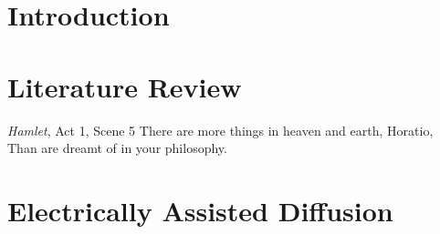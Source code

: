 \documentclass[a4paper, 12pt, twoside]{report}
\begin{document}
% 

 \pagestyle{empty}
 \setcounter{page}{1}
 
 
 \def\localpath{ThesisFrontmatter}
 
 
 \sglspace
 
 
 \tableofcontents
 \newpage
 
 \listoffigures
 \newpage
 
 \listoftables
 \newpage

 
 \newpage
 
 
 \newpage

 \setcounter{page}{0}
 \pagestyle{thesisheadings}
 
 
 \def\localpath{Intro}
 \chapter{Introduction}
 \dblspace
 \begin{quote}{\em }\end{quote}
 
 
 \def\localpath{LitReview}
 \chapter{Literature Review}
 \dblspace
 \begin{aquote}{\emph{Hamlet}, Act 1, Scene 5}
  {\selectfont
   There are more things in heaven and earth, Horatio,\\
   Than are dreamt of in your philosophy.
  }
 \end{aquote}
 

 
 \appendix
 \dblspace
 
 \chapter{Electrically Assisted Diffusion}
 \def\localpath{Appendices}
 

 \sglspace

 \pagestyle{bibheadings}

 
 
\end{document}
